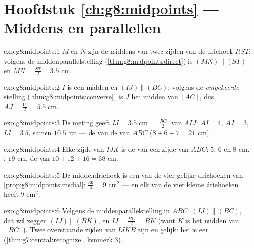 \section*{Hoofdstuk \ref{ch:g8:midpoints} --- Middens en parallellen}

\begin{solution}{exo:g8:midpoints:1}
$M$ en $N$ zijn de middens van twee zijden van de driehoek $RST$: volgens de
middenparallelstelling (\cref{thm:g8:midpoints:direct}) is
$(MN) \parallel (ST)$ en $MN = \frac{ST}{2} = 3.5$ cm.
\end{solution}

\begin{solution}{exo:g8:midpoints:2}
$I$ is een midden en $(IJ) \parallel (BC)$: volgens de \emph{omgekeerde} stelling
(\cref{thm:g8:midpoints:converse}) is $J$ het midden van $[AC]$, dus
$AJ = \frac{11}{2} = 5.5$ cm.
\end{solution}

\begin{solution}{exo:g8:midpoints:3}
De meting geeft $IJ = 3.5$ cm $= \frac{BC}{2}$.  van $AIJ$: $AI = 4$,
$AJ = 3$, $IJ = 3.5$, samen $10.5$ cm --- de  van de  van $ABC$
($8 + 6 + 7 = 21$ cm).
\end{solution}

\begin{solution}{exo:g8:midpoints:4}
Elke zijde van $IJK$ is de  van een zijde van $ABC$: $5$, $6$ en $8$ cm.
: $19$ cm, de  van $10 + 12 + 16 = 38$ cm.
\end{solution}

\begin{solution}{exo:g8:midpoints:5}
De middendriehoek is een van de vier gelijke driehoeken van
\cref{prop:g8:midpoints:medial}:  $\frac{36}{4} = 9$ cm$^2$ --- en elk
van de vier kleine driehoeken heeft  $9$ cm$^2$.
\end{solution}

\begin{solution}{exo:g8:midpoints:6}
Volgens de middenparallelstelling in $ABC$: $(IJ) \parallel (BC)$, dat wil zeggen
$(IJ) \parallel (BK)$, en $IJ = \frac{BC}{2} = BK$ (want $K$ is het midden van
$[BC]$). Twee overstaande zijden van $IJKB$ zijn  en gelijk: het is een
 (\cref{thm:g7:central:recognize}, kenmerk 3).
\end{solution}

